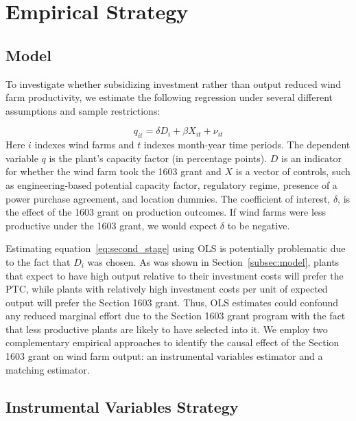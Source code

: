 \documentclass[12pt]{article}
\begin{document}
\section{Empirical Strategy \label{sec:Empirical-Strategy}}

\subsection{Model}

To investigate whether subsidizing investment rather than output reduced wind farm productivity, we estimate the following regression under several different assumptions and sample restrictions:

\begin{equation}
q_{it}=\delta D_{i}+\beta X_{it}+\nu_{it}\label{eq:second_stage}
\end{equation}
Here $i$ indexes wind farms and $t$ indexes month-year time periods. The dependent variable $q$ is the plant's capacity factor (in percentage points). $D$ is an indicator for whether the wind farm took the 1603 grant and $X$ is a vector of controls, such as engineering-based potential capacity factor, regulatory regime, presence of a power purchase agreement, and location dummies. The coefficient of interest, $\delta$, is the effect of the 1603 grant on production outcomes. If wind farms were less productive under the 1603 grant, we would expect $\delta$ to be negative.

Estimating equation~\ref{eq:second_stage} using OLS is potentially problematic due to the fact that $D_{i}$ was chosen. As was shown in Section~\ref{subsec:model}, plants that expect to have high output relative to their investment costs will prefer the PTC, while plants with relatively high investment costs per unit of expected output will prefer the Section 1603 grant. Thus, OLS estimates could confound any reduced marginal effort due to the Section 1603 grant program with the fact that less productive plants are likely to have selected into it. We employ two complementary empirical approaches to identify the causal effect of the Section 1603 grant on wind farm output: an instrumental variables estimator and a matching estimator.

\subsection{Instrumental Variables Strategy}
\end{document}
